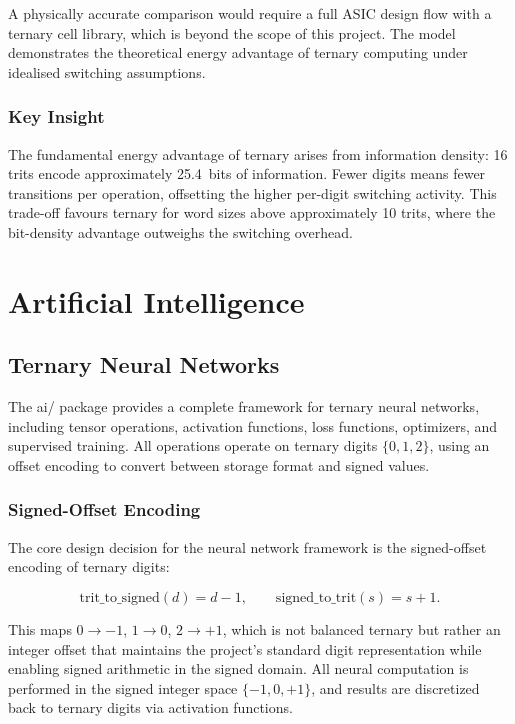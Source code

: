 \documentclass[12pt,a4paper,twoside]{book}
\theoremstyle{trinarytheorem}
\theoremstyle{trinarydefinition}
\newcommand{\code}[1]{\textsf{#1}}
\begin{document}
A physically accurate comparison would require a full ASIC design flow
with a ternary cell library, which is beyond the scope of this project.
The model demonstrates the theoretical energy advantage of ternary
computing under idealised switching assumptions.

\section{Key Insight}

The fundamental energy advantage of ternary arises from information
density: 16 trits encode approximately 25.4~bits of information.
Fewer digits means fewer transitions per operation, offsetting the
higher per-digit switching activity. This trade-off favours ternary
for word sizes above approximately 10 trits, where the bit-density
advantage outweighs the switching overhead.

\part{Artificial Intelligence}

\chapter{Ternary Neural Networks}
\label{ch:nn}

The \code{ai/} package provides a complete framework for ternary neural
networks, including tensor operations, activation functions, loss
functions, optimizers, and supervised training. All operations operate
on ternary digits $\{0,1,2\}$, using an offset encoding to convert
between storage format and signed values.

\section{Signed-Offset Encoding}

The core design decision for the neural network framework is the
signed-offset encoding of ternary digits:

\[
\text{trit\_to\_signed}(d) = d - 1,\qquad
\text{signed\_to\_trit}(s) = s + 1.
\]

This maps $0 \rightarrow -1$, $1 \rightarrow 0$, $2 \rightarrow +1$,
which is not balanced ternary but rather an integer offset that maintains
the project's standard digit representation while enabling signed
arithmetic in the signed domain. All neural computation is performed
in the signed integer space $\{-1,0,+1\}$, and results are discretized
back to ternary digits via activation functions.
\end{document}
